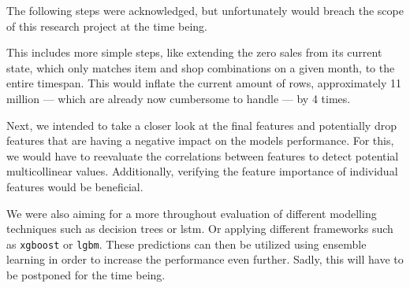 The following steps were acknowledged, but unfortunately would breach the scope of this research project at the time being.

This includes more simple steps, like extending the zero sales from its current state, which only matches item and shop combinations on a given month, to the entire timespan.
This would inflate the current amount of rows, approximately 11 million --- which are already now cumbersome to handle --- by 4 times.

Next, we intended to take a closer look at the final features and potentially drop features that are having a negative impact on the models performance. For this, we would have to reevaluate the correlations between features to detect potential multicollinear values. Additionally, verifying the feature importance of individual features would be beneficial.

We were also aiming for a more throughout evaluation of different modelling techniques such as decision trees or \acrshort{lstm}. Or applying different frameworks such as \texttt{xgboost} or \texttt{\acrshort{lgbm}}.
These predictions can then be utilized using ensemble learning in order to increase the performance even further. Sadly, this will have to be postponed for the time being.
